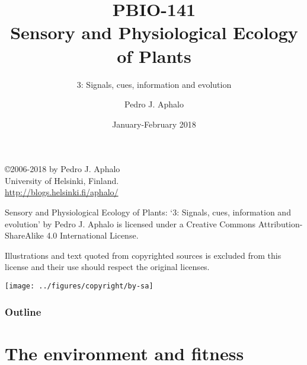 \documentclass[10pt]{beamer}
\begin{document}
\title{PBIO-141\\Sensory and Physiological Ecology\\ of  Plants}
\subtitle{3: Signals, cues, information and evolution}
\author{Pedro J. Aphalo}
\date{January-February 2018}


  \begin{frame}
    \maketitle
  \end{frame}

  \begin{frame}[c]
    \begin{center}
      \begin{small}
        \copyright 2006-2018 by Pedro J. Aphalo\\
       University of Helsinki, Finland.\\
        \textcolor{blue}{\url{http://blogs.helsinki.fi/aphalo/}}\\[2ex]
      \end{small}

      \begin{footnotesize}
        Sensory and Physiological Ecology of  Plants: `3: Signals, cues, information and evolution' by Pedro J. Aphalo is licensed under a Creative Commons Attribution-ShareAlike 4.0 International License.

        Illustrations and text quoted from copyrighted sources is excluded from this license and their use should respect the original licenses.\\[2ex]
      \end{footnotesize}

      \texttt{[image: ../figures/copyright/by-sa]}
    \end{center}
  \end{frame}

  \begin{frame}
    \frametitle{Outline}
    \tableofcontents
  \end{frame}


\section{The environment and fitness}
\end{document}
